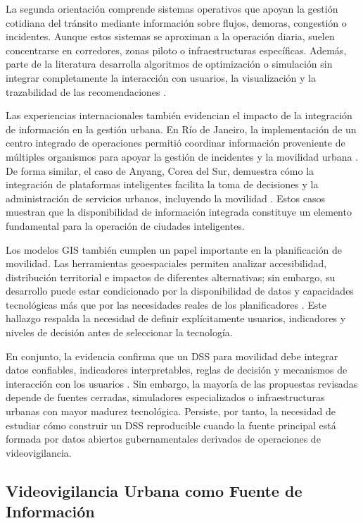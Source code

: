 \documentclass[]{IEEEphot}
\begin{document}
La segunda orientación comprende sistemas operativos que apoyan la gestión cotidiana del tránsito mediante información sobre flujos, demoras, congestión o incidentes. Aunque estos sistemas se aproximan a la operación diaria, suelen concentrarse en corredores, zonas piloto o infraestructuras específicas. Además, parte de la literatura desarrolla algoritmos de optimización o simulación sin integrar completamente la interacción con usuarios, la visualización y la trazabilidad de las recomendaciones \cite{paddeu2021collaborative}.

Las experiencias internacionales también evidencian el impacto de la integración de información en la gestión urbana. En Río de Janeiro, la implementación de un centro integrado de operaciones permitió coordinar información proveniente de múltiples organismos para apoyar la gestión de incidentes y la movilidad urbana \cite{schreiner2016international}. De forma similar, el caso de Anyang, Corea del Sur, demuestra cómo la integración de plataformas inteligentes facilita la toma de decisiones y la administración de servicios urbanos, incluyendo la movilidad \cite{lee2016international}. Estos casos muestran que la disponibilidad de información integrada constituye un elemento fundamental para la operación de ciudades inteligentes.

Los modelos GIS también cumplen un papel importante en la planificación de movilidad. Las herramientas geoespaciales permiten analizar accesibilidad, distribución territorial e impactos de diferentes alternativas; sin embargo, su desarrollo puede estar condicionado por la disponibilidad de datos y capacidades tecnológicas más que por las necesidades reales de los planificadores \cite{liu2023gis}. Este hallazgo respalda la necesidad de definir explícitamente usuarios, indicadores y niveles de decisión antes de seleccionar la tecnología.

En conjunto, la evidencia confirma que un DSS para movilidad debe integrar datos confiables, indicadores interpretables, reglas de decisión y mecanismos de interacción con los usuarios \cite{shulajkovska2024artificial,salanova2022multilevel,liu2023gis}. Sin embargo, la mayoría de las propuestas revisadas depende de fuentes cerradas, simuladores especializados o infraestructuras urbanas con mayor madurez tecnológica. Persiste, por tanto, la necesidad de estudiar cómo construir un DSS reproducible cuando la fuente principal está formada por datos abiertos gubernamentales derivados de operaciones de videovigilancia.

\subsection{Videovigilancia Urbana como Fuente de Información}
\end{document}
